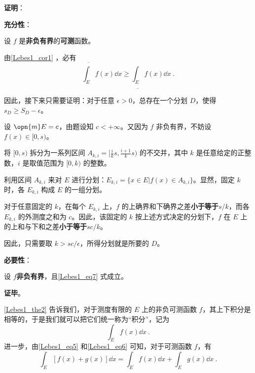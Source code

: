 \textbf{证明}：

\textbf{充分性}：

设 $f$ 是\textbf{非负有界}的\textbf{可测}函数。

由\autoref{Lebes1_cor1} ，必有
\begin{equation}
\overline{\int_E} f(x) \dd x \geq \underline{\int_E} f(x) \dd x~.
\end{equation}

因此，接下来只需要证明：对于任意 $\epsilon>0$，总存在一个分划 $D$，使得 $s_D\geq S_D-\epsilon$。

设 $\opn{m}E=c$，由题设知 $c<+\infty$。又因为 $f$ 非负有界，不妨设 $f(x)\in [0, s)$。

将 $[0, s)$ 拆分为一系列区间 $A_{k, i}=[\frac{i}{k}s, \frac{i+1}{k}s)$ 的不交并，其中 $k$ 是任意给定的正整数，$i$ 是取值范围为 $[0, k)$ 的整数。

利用区间 $A_{k, i}$ 来对 $E$ 进行分划：$E_{k, i}=\{x\in E|f(x)\in A_{k, i}\}$。显然，固定 $k$ 时，各 $E_{k, i}$ 构成 $E$ 的一组分划。

对于任意固定的 $k$，在每个 $E_{k, i}$ 上，$f$ 的上确界和下确界之差\textbf{小于等于}$s/k$，而各 $E_{k, i}$ 的外测度之和为 $c$。因此，该固定的 $k$ 按上述方式决定的分划下，$f$ 在 $E$ 上的上和与下和之差\textbf{小于等于}$sc/k$。

因此，只需要取 $k>sc/\epsilon$，所得分划就是所要的 $D$。

\textbf{必要性}：

设 $f$\textbf{非负有界}，且\autoref{Lebes1_eq7} 式成立。




\textbf{证毕}。



\autoref{Lebes1_the2} 告诉我们，对于测度有限的 $E$ 上的非负可测函数 $f$，其上下积分是相等的，于是我们就可以把它们统一称为“积分”，记为
\begin{equation}
\int_E f(x) \dd x~.
\end{equation}
进一步，由\autoref{Lebes1_eq5} 和\autoref{Lebes1_eq6} 可知，对于可测函数 $f$，有
\begin{equation}
\int_E [f(x)+g(x)] \dd x=\int_E f(x) \dd x+\int_E g(x) \dd x~.
\end{equation}






